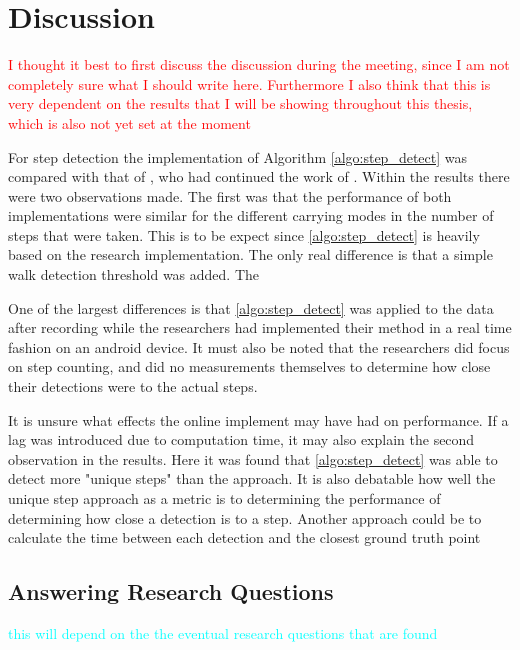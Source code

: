 \chapter{Discussion}

\textcolor{red}{I thought it best to first discuss the discussion during the meeting, since I am not completely sure what I should write here. Furthermore I also think that this is very dependent on the results that I will be showing throughout this thesis, which is also not yet set at the moment}

For step detection the implementation of Algorithm \ref{algo:step_detect} was compared with that of \citet{Salvi2018}, who had continued the work of \cite{Harle2013}. Within the results there were two observations made. The first was that the performance of both implementations were similar for the different carrying modes in the number of steps that were taken. This is to be expect since \cref{algo:step_detect} is heavily based on the research implementation. The only real difference is that a simple walk detection threshold was added. The  \par 

One of the largest differences is that \cref{algo:step_detect} was applied to the data after recording while the researchers had implemented their method in a real time fashion on an android device. It must also be noted that the researchers did focus on step counting, and did no measurements themselves to determine how close their detections were to the actual steps. \par 

It is unsure what effects the online implement may have had on performance. If a lag was introduced due to computation time, it may also explain the second observation in the results. Here it was found that \cref{algo:step_detect} was able to detect more "unique steps" than the \cite{Salvi2018} approach. It is also debatable how well the unique step approach as a metric is to determining the performance of determining how close a detection is to a step. Another approach could be to calculate the time between each detection and the closest ground truth point


\section{Answering Research Questions}

\textcolor{cyan}{this will depend on the the eventual research questions that are found}

